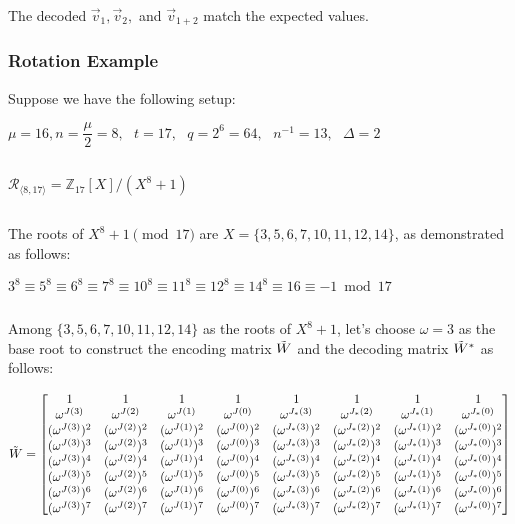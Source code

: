 $ $

The decoded $\vec{v}_1, \vec{v}_2,$ and $\vec{v}_{1+2}$ match the expected values.  




\subsubsection{Rotation Example}
\label{subsubsec:bfv-rotation-ex}

Suppose we have the following setup: 

$\mu = 16, n = \dfrac{\mu}{2} = 8, \text{ } t = 17, \text{ } q = 2^6 = 64, \text{ } n^{-1} = 13, \text{ } \Delta = 2$

$ $

$\mathcal{R}_{\langle 8, 17 \rangle} = \mathbb{Z}_{17}[X] / (X^8 + 1)$

$ $

The roots of $X^8 + 1 \pmod{17}$ are $X = \{3, 5, 6, 7, 10, 11, 12, 14\}$, as demonstrated as follows:

$3^8 \equiv 5^8 \equiv 6^8 \equiv 7^8 \equiv 10^8 \equiv 11^8 \equiv 12^8 \equiv 14^8 \equiv 16 \equiv -1 \bmod{17}$


$ $

Among $\{3, 5, 6, 7, 10, 11, 12, 14\}$ as the roots of $X^8 + 1$, let's choose $\omega = 3$ as the base root to construct the encoding matrix $\tilde{W}$ and the decoding matrix $\tilde{W}^*$ as follows: 

$\tilde{W} = \begin{bmatrix}
1 & 1 & 1 & 1 & 1 & 1 & 1 & 1\\
\omega^{J(3)} & \omega^{J(2)} & \omega^{J(1)} & \omega^{J(0)} & \omega^{J_*(3)} & \omega^{J_*(2)} & \omega^{J_*(1)} & \omega^{J_*(0)}\\
(\omega^{J(3)})^2 & (\omega^{J(2)})^2 & (\omega^{J(1)})^2 & (\omega^{J(0)})^2 & (\omega^{J_*(3)})^2 & (\omega^{J_*(2)})^2 & (\omega^{J_*(1)})^2 & (\omega^{J_*(0)})^2\\
(\omega^{J(3)})^3 & (\omega^{J(2)})^3 & (\omega^{J(1)})^3 & (\omega^{J(0)})^3 & (\omega^{J_*(3)})^3 & (\omega^{J_*(2)})^3 & (\omega^{J_*(1)})^3 & (\omega^{J_*(0)})^3\\
(\omega^{J(3)})^4 & (\omega^{J(2)})^4 & (\omega^{J(1)})^4 & (\omega^{J(0)})^4 & (\omega^{J_*(3)})^4 & (\omega^{J_*(2)})^4 & (\omega^{J_*(1)})^4 & (\omega^{J_*(0)})^4\\
(\omega^{J(3)})^5 & (\omega^{J(2)})^5 & (\omega^{J(1)})^5 & (\omega^{J(0)})^5 & (\omega^{J_*(3)})^5 & (\omega^{J_*(2)})^5 & (\omega^{J_*(1)})^5 & (\omega^{J_*(0)})^5\\
(\omega^{J(3)})^6 & (\omega^{J(2)})^6 & (\omega^{J(1)})^6 & (\omega^{J(0)})^6 & (\omega^{J_*(3)})^6 & (\omega^{J_*(2)})^6 & (\omega^{J_*(1)})^6 & (\omega^{J_*(0)})^6\\
(\omega^{J(3)})^7 & (\omega^{J(2)})^7 & (\omega^{J(1)})^7 & (\omega^{J(0)})^7 & (\omega^{J_*(3)})^7 & (\omega^{J_*(2)})^7 & (\omega^{J_*(1)})^7 & (\omega^{J_*(0)})^7\\
\end{bmatrix}$ 


